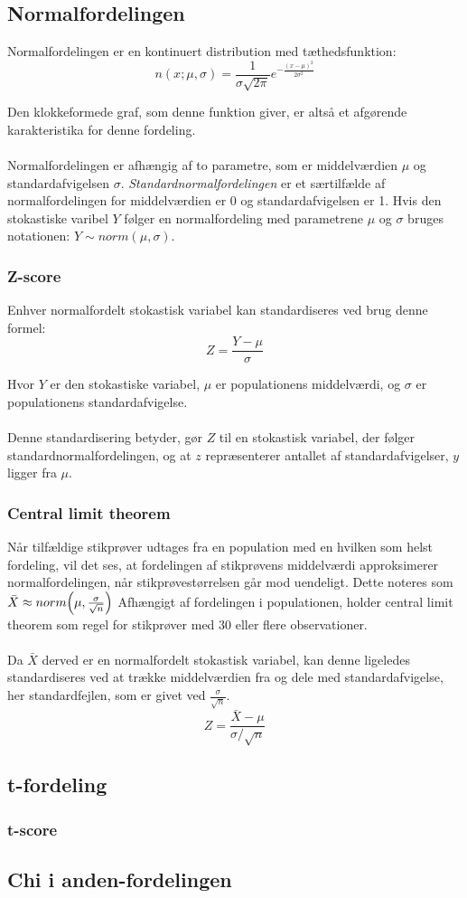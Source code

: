 \subsection{Normalfordelingen}
Normalfordelingen er en kontinuert distribution med tæthedsfunktion:
$$n(x;\mu, \sigma)=\frac{1}{\sigma\sqrt{2\pi}}e^{-\frac{(x-\mu)^2}{2\sigma^2}}$$

\noindent Den klokkeformede graf, som denne funktion giver, er altså et afgørende karakteristika for denne fordeling.
\\
\\
\noindent Normalfordelingen er afhængig af to parametre, som er middelværdien $\mu$ og standardafvigelsen $\sigma$.
\emph{Standardnormalfordelingen} er et særtilfælde af normalfordelingen for middelværdien er 0 og standardafvigelsen er 1.
Hvis den stokastiske varibel $Y$ følger en normalfordeling med parametrene $\mu$ og $\sigma$ bruges notationen:
$Y \sim norm(\mu,\sigma)$.

\subsubsection{Z-score}
Enhver normalfordelt stokastisk variabel kan standardiseres ved brug denne formel:
$$Z=\frac{Y-\mu}{\sigma}$$

\noindent Hvor $Y$ er den stokastiske variabel, $\mu$ er populationens middelværdi, og $\sigma$ er populationens standardafvigelse.
\\
\\
\noindent Denne standardisering betyder, gør $Z$ til en stokastisk variabel, der følger standardnormalfordelingen, og at $z$ repræsenterer antallet af standardafvigelser, $y$ ligger fra $\mu$. 

\subsubsection{Central limit theorem}
Når tilfældige stikprøver udtages fra en population med en hvilken som helst fordeling, vil det ses, at fordelingen af stikprøvens middelværdi approksimerer normalfordelingen, når stikprøvestørrelsen går mod uendeligt.
Dette noteres som $\bar{X} \approx norm\Bigl(\mu,\frac{\sigma}{\sqrt{n}}\Bigr)$ 
Afhængigt af fordelingen i populationen, holder central limit theorem som regel for stikprøver med 30 eller flere observationer. 
\\
\\
\noindent Da $\bar{X}$ derved er en normalfordelt stokastisk variabel, kan denne ligeledes standardiseres ved at trække middelværdien fra og dele med standardafvigelse, her standardfejlen, som er givet ved $\frac{\sigma}{\sqrt{n}}$.
$$Z=\frac{\bar{X}-\mu}{\sigma/\sqrt{n}}$$


\subsection{t-fordeling}

\subsubsection{t-score}

\subsection{Chi i anden-fordelingen}
